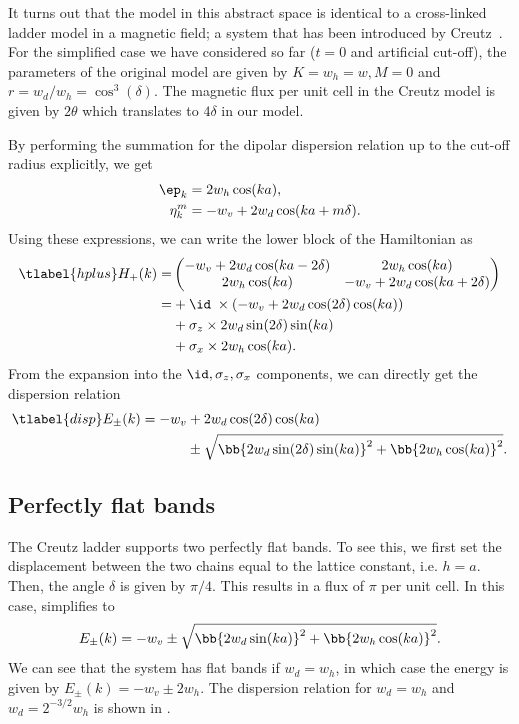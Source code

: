 It turns out that the model in this abstract space is identical to a cross-linked ladder model in a magnetic field; a system that has been introduced by Creutz~\cite{Creutz1999}.
For the simplified case we have considered so far ($t=0$ and artificial cut-off), the parameters of the original model are given by $K=w_h=w, M=0$ and $r=w_d/w_h=\cos^3(\delta)$.
The magnetic flux per unit cell in the Creutz model is given by $2\theta$ which translates to $4\delta$ in our model.

By performing the summation for the dipolar dispersion relation up to the cut-off radius explicitly, we get
\begin{align}
    \ep_k &= 2 w_h \cos(ka), \\
    \eta_k^m &= -w_v + 2 w_d \cos(ka + m\delta).
\end{align}
Using these expressions, we can write the lower block of the Hamiltonian as
\begin{align} \tlabel{hplus}
    H_+(k) = &\begin{pmatrix}
        -w_v + 2w_d \cos(ka-2\delta) & 2w_h \cos(ka) \\
        2w_h\cos(ka) & -w_v + 2w_d \cos(ka+2\delta)
    \end{pmatrix} \\
    = &+\id \; \times (-w_v + 2w_d \cos(2\delta) \cos(ka)) \\
    &+\sigma_z \times 2w_d \sin(2\delta) \sin(ka) \\
    &+\sigma_x \times 2w_h \cos(ka).
\end{align}
From the expansion into the $\id, \sigma_z, \sigma_x$ components, we can directly get the dispersion relation
\begin{align} \tlabel{disp}
    E_\pm(k) = -w_v &+ 2w_d \cos(2\delta)\cos(ka) \\
                    &\pm \sqrt{ \bb{ 2w_d\sin(2\delta)\sin(ka) }^2 + \bb{ 2w_h\cos(ka) }^2 }.
\end{align}

\subsection{Perfectly flat bands}
The Creutz ladder supports two perfectly flat bands. To see this, we first set the displacement between the two chains equal to the lattice constant, i.e. $h=a$.
Then, the angle $\delta$ is given by $\pi/4$.
This results in a flux of $\pi$ per unit cell.
In this case,  simplifies to
\begin{align}
    E_\pm(k) = -w_v \pm \sqrt{ \bb{ 2w_d\sin(ka) }^2 + \bb{ 2w_h\cos(ka) }^2 }.
\end{align}
We can see that the system has flat bands if $w_d = w_h$, in which case the energy is given by $E_\pm(k) = -w_v \pm 2 w_h$.
The dispersion relation for $w_d=w_h$ and $w_d = 2^{-3/2} w_h$ is shown in .

